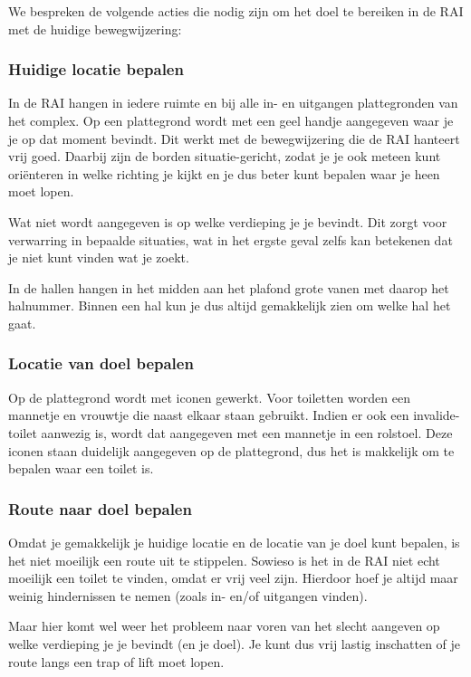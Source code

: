 We bespreken de volgende acties die nodig zijn om het doel te bereiken in de RAI met de huidige bewegwijzering:


\subsubsection{Huidige locatie bepalen}

In de RAI hangen in iedere ruimte en bij alle in- en uitgangen plattegronden van het complex. Op een plattegrond wordt met een geel handje aangegeven waar je je op dat moment bevindt. Dit werkt met de bewegwijzering die de RAI hanteert vrij goed. Daarbij zijn de borden situatie-gericht, zodat je je ook meteen kunt ori\"enteren in welke richting je kijkt en je dus beter kunt bepalen waar je heen moet lopen.

Wat niet wordt aangegeven is op welke verdieping je je bevindt. Dit zorgt voor verwarring in bepaalde situaties, wat in het ergste geval zelfs kan betekenen dat je niet kunt vinden wat je zoekt.

In de hallen hangen in het midden aan het plafond grote vanen met daarop het halnummer. Binnen een hal kun je dus altijd gemakkelijk zien om welke hal het gaat.


\subsubsection{Locatie van doel bepalen}

Op de plattegrond wordt met iconen gewerkt. Voor toiletten worden een mannetje en vrouwtje die naast elkaar staan gebruikt. Indien er ook een invalide-toilet aanwezig is, wordt dat aangegeven met een mannetje in een rolstoel. Deze iconen staan duidelijk aangegeven op de plattegrond, dus het is makkelijk om te bepalen waar een toilet is.


\subsubsection{Route naar doel bepalen}

Omdat je gemakkelijk je huidige locatie en de locatie van je doel kunt bepalen, is het niet moeilijk een route uit te stippelen. Sowieso is het in de RAI niet echt moeilijk een toilet te vinden, omdat er vrij veel zijn. Hierdoor hoef je altijd maar weinig hindernissen te nemen (zoals in- en/of uitgangen vinden).

Maar hier komt wel weer het probleem naar voren van het slecht aangeven op welke verdieping je je bevindt (en je doel). Je kunt dus vrij lastig inschatten of je route langs een trap of lift moet lopen.


